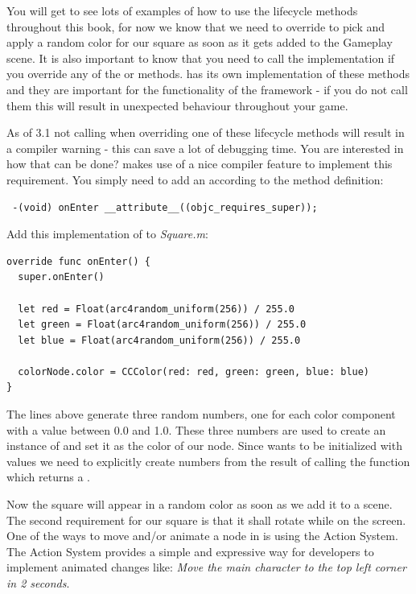 You will get to see lots of examples of how to use the lifecycle methods
throughout this book, for now we know that we need to override
 to pick and apply a random color for our square as soon as
it gets added to the Gameplay scene. It is also important to know that you need
to call the  implementation if you override any of the 
 or  methods. \ccnode{}
has its own implementation of these methods and they are important for the
functionality of the framework - if you do not call them this will result in
unexpected behaviour throughout your game. 
\begin{details}
As of \cocos{} 3.1 not calling  when overriding one of these
lifecycle methods will result in a compiler warning - this can save a lot of
debugging time. You are interested in how that can be done? \cocos{} makes use
of a nice compiler feature to implement this requirement. You simply need to
add an according  to the method definition:

\begin{lstlisting}
 -(void) onEnter __attribute__((objc_requires_super));
\end{lstlisting}

\end{details}
\begin{leftbar}
Add this implementation of
 to \textit{Square.m}:
\begin{lstlisting}
override func onEnter() {
  super.onEnter()
  
  let red = Float(arc4random_uniform(256)) / 255.0
  let green = Float(arc4random_uniform(256)) / 255.0
  let blue = Float(arc4random_uniform(256)) / 255.0
  
  colorNode.color = CCColor(red: red, green: green, blue: blue)
}
\end{lstlisting}
\end{leftbar}
The lines above generate three random numbers, one for each color component
with a value between 0.0 and 1.0. These three numbers are used to create an
instance of  and set it as the color of our node. Since
 wants to be initialized with  values we
need to explicitly create  numbers from the result of calling
the  function which returns a
.

Now the square will appear in a random color as soon as we add it to a scene.
The second requirement for our square is that it shall rotate while on the
screen. One of the ways to move and/or animate a node in \cocos{} is using the
\cocos{} Action System. The Action System provides a simple
and expressive way for developers to implement animated changes like:
\textit{Move the main character to the top left corner in 2 seconds}. 

